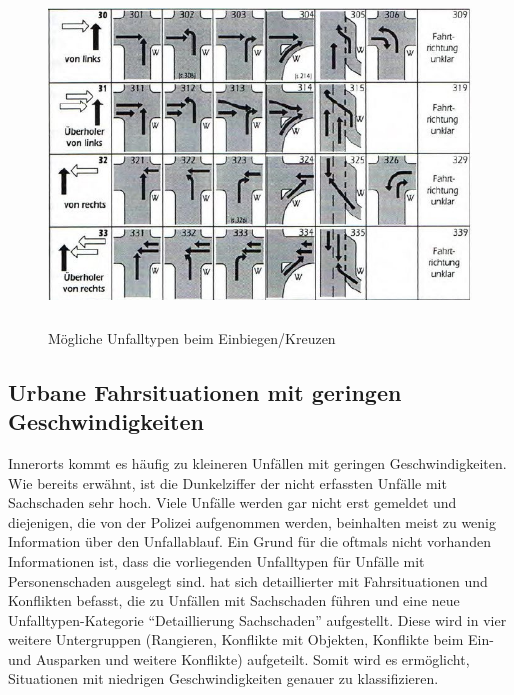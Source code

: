 \begin{savenotes}
	\begin{figure}[H]
		\centering
		\includegraphics[width=13cm,height=9cm]{figures/Einbiege-Unfall}
		\caption[Unfalltyp 3 Einbiegen/Kreuzen-Unfall]{Mögliche Unfalltypen beim Einbiegen/Kreuzen \parencite[S. 13]{GesamtverbandderDeutschenVersicherungswirtschafte.V..2016}}\label{fig:Einbiege-Unfall}
	\end{figure}
\end{savenotes}

\subsection{Urbane Fahrsituationen mit geringen Geschwindigkeiten}\label{Urabane Fahrsituationen mit geringen Geschwindigkeiten}
Innerorts kommt es häufig zu kleineren Unfällen mit geringen Geschwindigkeiten. Wie bereits erwähnt, ist die Dunkelziffer der nicht erfassten Unfälle mit Sachschaden sehr hoch. Viele Unfälle werden gar nicht erst gemeldet und diejenigen, die von der Polizei aufgenommen werden, beinhalten meist zu wenig Information über den Unfallablauf. Ein Grund für die oftmals nicht vorhanden Informationen ist, dass die vorliegenden Unfalltypen für Unfälle mit Personenschaden ausgelegt sind. \Textcite[S. 58]{Gschwendtner.2015} hat sich detaillierter mit Fahrsituationen und Konflikten befasst, die zu Unfällen mit Sachschaden führen und eine neue Unfalltypen-Kategorie \enquote{Detaillierung Sachschaden} aufgestellt. Diese wird in vier weitere Untergruppen (Rangieren, Konflikte mit Objekten, Konflikte beim Ein- und Ausparken und weitere Konflikte) aufgeteilt. Somit wird es ermöglicht, Situationen mit niedrigen Geschwindigkeiten genauer zu klassifizieren.

